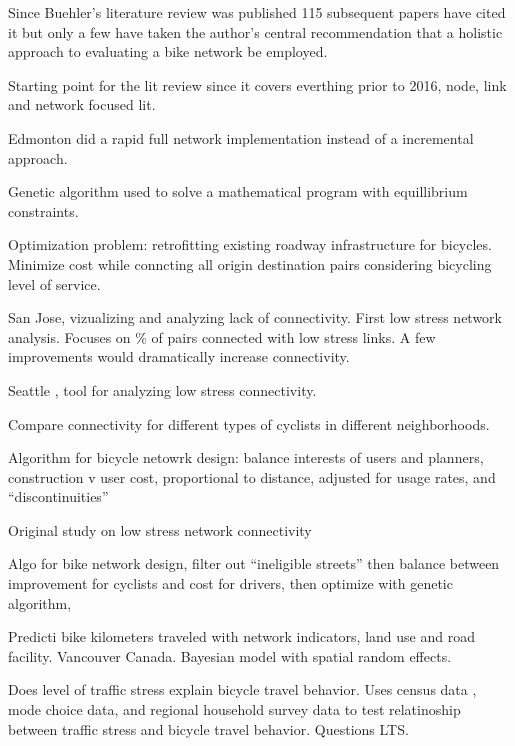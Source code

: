 \documentclass[11pt]{article} %
\begin{document}
	
Since Buehler's literature review was published 115 subsequent papers have cited it but only a few have taken the author's central recommendation that a holistic approach to evaluating a bike network be employed. 


Starting point for the lit review since it covers everthing prior to 2016, node, link and network focused lit. 
\cite{buehler2016bikeway}

Edmonton did a rapid full network implementation instead of a incremental approach. 
\cite{cabral2019low}

Genetic algorithm used to solve a mathematical program with equillibrium constraints. 
\cite{doorley2019designing}

Optimization problem: retrofitting existing roadway infrastructure for bicycles. Minimize cost while conncting all origin destination pairs considering bicycling level of service. 
\cite{duthie2014optimization}

San Jose, vizualizing and analyzing lack of connectivity. 
First low stress network analysis. Focuses on \% of pairs connected with low stress links. A few improvements would dramatically increase connectivity. 
\cite{furth2016network}

Seattle , tool for analyzing low stress connectivity. 
\cite{lowry2016prioritizing}

Compare connectivity for different types of cyclists in different neighborhoods. 
\cite{lowry2017quantifying}

Algorithm for bicycle netowrk design: balance interests of users and planners, construction v user cost, proportional to distance, adjusted for usage rates, and ``discontinuities'' 
\cite{mauttone2017bicycle}

Original study on low stress network connectivity
\cite{mekuria2012low}


Algo for bike network design, filter out ``ineligible streets'' then balance between improvement for cyclists and cost for drivers, then optimize with genetic algorithm, 
\cite{mesbah2012bilevel}


Predicti bike kilometers traveled with network indicators, land use and road facility. Vancouver Canada. Bayesian model with spatial random effects. 
\cite{osama2017models}


Does level of traffic stress explain bicycle travel behavior. Uses census data , mode choice data, and regional household survey data to test relatinoship between traffic stress and bicycle travel behavior. Questions LTS. 
\cite{wang2016does}
\end{document}
